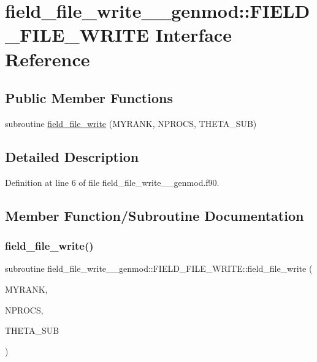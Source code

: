 \hypertarget{interfacefield__file__write____genmod_1_1_f_i_e_l_d___f_i_l_e___w_r_i_t_e}{}\section{field\+\_\+file\+\_\+write\+\_\+\+\_\+genmod\+::F\+I\+E\+L\+D\+\_\+\+F\+I\+L\+E\+\_\+\+W\+R\+I\+TE Interface Reference}
\label{interfacefield__file__write____genmod_1_1_f_i_e_l_d___f_i_l_e___w_r_i_t_e}
\subsection*{Public Member Functions}
\begin{DoxyCompactItemize}
\item 
subroutine \mbox{\hyperlink{interfacefield__file__write____genmod_1_1_f_i_e_l_d___f_i_l_e___w_r_i_t_e_a5a33ccf33508a6c5bef750436ac9fc9b}{field\+\_\+file\+\_\+write}} (M\+Y\+R\+A\+NK, N\+P\+R\+O\+CS, T\+H\+E\+T\+A\+\_\+\+S\+UB)
\end{DoxyCompactItemize}


\subsection{Detailed Description}


Definition at line 6 of file field\+\_\+file\+\_\+write\+\_\+\+\_\+genmod.\+f90.



\subsection{Member Function/\+Subroutine Documentation}
\mbox{\label{interfacefield__file__write____genmod_1_1_f_i_e_l_d___f_i_l_e___w_r_i_t_e_a5a33ccf33508a6c5bef750436ac9fc9b}} 
\subsubsection{\texorpdfstring{field\_file\_write()}{field\_file\_write()}}
{\footnotesize\ttfamily subroutine field\+\_\+file\+\_\+write\+\_\+\+\_\+genmod\+::\+F\+I\+E\+L\+D\+\_\+\+F\+I\+L\+E\+\_\+\+W\+R\+I\+T\+E\+::field\+\_\+file\+\_\+write (\begin{DoxyParamCaption}\item[{integer(kind=4), intent(in)}]{M\+Y\+R\+A\+NK,  }\item[{integer(kind=4), intent(in)}]{N\+P\+R\+O\+CS,  }\item[{real(kind=8), dimension(0\+:nx\+\_\+sub,0\+:ny\+\_\+sub,0\+:nz\+\_\+sub), intent(in)}]{T\+H\+E\+T\+A\+\_\+\+S\+UB }\end{DoxyParamCaption})}



